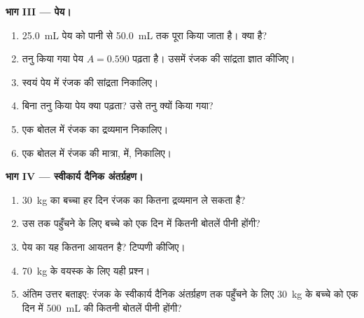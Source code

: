\begin{problem}
\medskip
\noindent\textbf{भाग III --- पेय।}
\begin{enumerate}[resume]
  \item \qty{25.0}{mL} पेय को पानी से \qty{50.0}{mL} तक पूरा किया जाता है।
         क्या है?
  \item तनु किया गया पेय $A = 0.590$ पढ़ता है। उसमें रंजक की सांद्रता ज्ञात
        कीजिए।
  \item स्वयं पेय में रंजक की सांद्रता निकालिए।
  \item बिना तनु किया पेय क्या पढ़ता? उसे तनु क्यों किया गया?
  \item एक बोतल में रंजक का द्रव्यमान निकालिए।
  \item एक बोतल में रंजक की मात्रा,  में, निकालिए।
\end{enumerate}

\medskip
\noindent\textbf{भाग IV --- स्वीकार्य दैनिक अंतर्ग्रहण।}
\begin{enumerate}[resume]
  \item \qty{30}{kg} का बच्चा हर दिन रंजक का कितना द्रव्यमान ले
        सकता है?
  \item उस तक पहुँचने के लिए बच्चे को एक दिन में कितनी बोतलें पीनी होंगी?
  \item पेय का यह कितना आयतन है? टिप्पणी कीजिए।
  \item \qty{70}{kg} के वयस्क के लिए यही प्रश्न।
  \item अंतिम उत्तर बताइए: रंजक के स्वीकार्य दैनिक अंतर्ग्रहण तक पहुँचने के लिए
        \qty{30}{kg} के बच्चे को एक दिन में \qty{500}{mL} की कितनी बोतलें पीनी
        होंगी?
\end{enumerate}
\end{problem}
